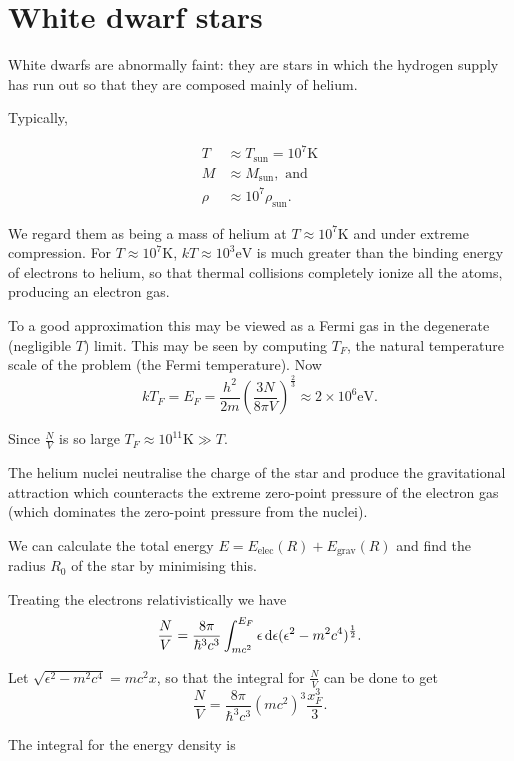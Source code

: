 \documentclass{notes}
\begin{document}
\section{White dwarf stars}

White dwarfs are abnormally faint: they are stars in which the
hydrogen supply has run out so that they are composed mainly of
helium.

Typically,

\begin{align*}
T & \approx T_{\text{sun}} = 10^7 \mathrm{K} \\
M & \approx M_{\text{sun}}, \text{ and} \\
\rho & \approx 10^7 \rho_{\text{sun}}.
\end{align*}

We regard them as being a mass of helium at $T \approx 10^7
\mathrm{K}$ and under extreme compression.  For $T \approx 10^7 \mathrm{K}$,
$k T \approx 10^3 \mathrm{eV}$ is much greater than the binding energy
of electrons to helium, so that thermal collisions completely ionize
all the atoms, producing an electron gas.

To a good approximation this may be viewed as a Fermi gas in the
degenerate (negligible $T$) limit.  This may be seen by computing
$T_F$, the natural temperature scale of the problem (the Fermi
temperature).  Now
\[
k T_F = E_F = \frac{h^2}{2 m} \left( \frac{ 3 N}{8 \pi
    V}\right)^{\frac{2}{3}} \approx 2 \times 10^6 \mathrm{eV}.
\]

Since $\tfrac{N}{V}$ is so large $T_F \approx 10^{11} \mathrm{K} \gg
T$.

The helium nuclei neutralise the charge of the star and produce the
gravitational attraction which counteracts the extreme zero-point
pressure of the electron gas (which dominates the zero-point pressure
from the nuclei).

We can calculate the total energy $E = E_{\text{elec}}(R) +
E_{\text{grav}}(R)$ and find the radius $R_0$ of the star by
minimising this.

Treating the electrons relativistically we have
\[
\frac{N}{V} = \frac{8 \pi}{\hbar^3 c^3} \int_{mc^2}^{E_F} \epsilon\,
\mathrm{d} \epsilon (\epsilon^2 - m^2 c^4)^{\frac{1}{2}}.
\]

Let $\sqrt{\epsilon^2 - m^2 c^4} = m c^2 x$, so that the integral for
$\tfrac{N}{V}$ can be done to get
\[
\frac{N}{V} = \frac{8 \pi}{\hbar^3 c^3} (mc^2)^3 \frac{x_F^3}{3}.
\]

The integral for the energy density is
\end{document}
